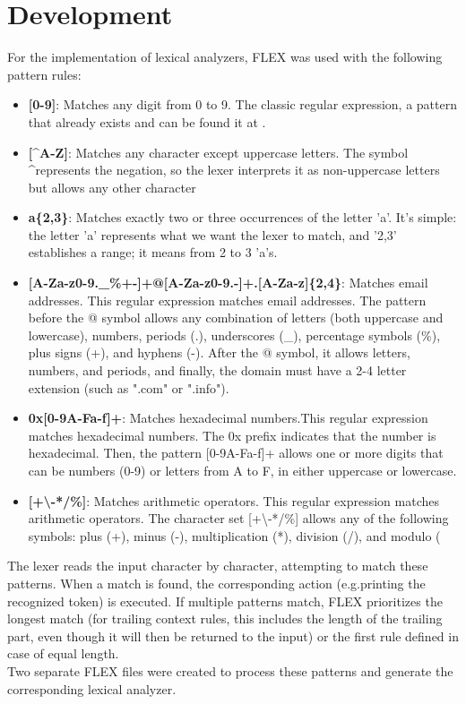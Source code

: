 \documentclass[a4paper,11pt]{scrarticle}
\begin{document}
    \section{Development}
    For the implementation of lexical analyzers, FLEX was used with the following pattern rules:
    \begin{itemize}
        \item \textbf{[0-9]}: Matches any digit from 0 to 9. The classic regular expression, a pattern that already exists and can be found it at \cite{flex_manual}.
        \item \textbf{[\textasciicircum A-Z]}: Matches any character except uppercase letters. The symbol \textasciicircum represents the negation, so the lexer interprets it as non-uppercase letters but allows any other character
        \item \textbf{a\{2,3\}}: Matches exactly two or three occurrences of the letter 'a'. It's simple: the letter 'a' represents what we want the lexer to match, and '{2,3}' establishes a range; it means from 2 to 3 'a's.
        \item \textbf{[A-Za-z0-9.\_\%+-]+@[A-Za-z0-9.-]+.[A-Za-z]\{2,4\}}: Matches email addresses. This regular expression matches email addresses. The pattern before the @ symbol allows any combination of letters (both uppercase and lowercase), numbers, periods (.), underscores (\_), percentage symbols (\%), plus signs (+), and hyphens (-). After the @ symbol, it allows letters, numbers, and periods, and finally, the domain must have a 2-4 letter extension (such as ".com" or ".info").
        \item \textbf{0x[0-9A-Fa-f]+}: Matches hexadecimal numbers.This regular expression matches hexadecimal numbers. The 0x prefix indicates that the number is hexadecimal. Then, the pattern [0-9A-Fa-f]+ allows one or more digits that can be numbers (0-9) or letters from A to F, in either uppercase or lowercase.
        \item \textbf{[+\textbackslash -*/\%]}: Matches arithmetic operators. This regular expression matches arithmetic operators. The character set [+\textbackslash -*/\%] allows any of the following symbols: plus (+), minus (-), multiplication (*), division (/), and modulo (%
    \end{itemize}
    The lexer reads the input character by character, attempting to match these patterns. When a match is found, the corresponding action (e.g.printing the recognized token) is executed. If multiple patterns match, FLEX prioritizes the longest match (for trailing context rules, this includes the length of the trailing part, even though it will then be returned to the input) or the first rule defined in case of equal length.\\
    Two separate FLEX files were created to process these patterns and generate the corresponding lexical analyzer.
\end{document}
